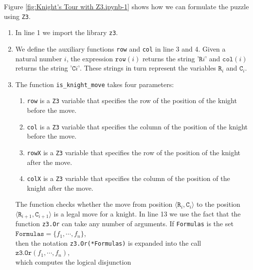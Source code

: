 Figure \ref{fig:Knight's Tour with Z3.ipynb-1} shows how we can formulate the puzzle using \texttt{Z3}.
\begin{enumerate}
\item In line 1 we import the library \texttt{z3}.
 
\item We define the auxiliary functions \texttt{row} and \texttt{col} in line 3 and 4.
      Given a natural number $i$, the expression $\mathtt{row}(i)$ returns the string $\texttt{'R}i\texttt{'}$
      and  $\mathtt{col}(i)$ returns the string  $\texttt{'C}i\texttt{'}$.  These strings in turn represent the
      variables $\mathtt{R}_i$ and $\mathtt{C}_i$.
\item The function \texttt{is\_knight\_move} takes four parameters:
      \begin{enumerate}
      \item \texttt{row} is a \texttt{Z3} variable that specifies the row of the position of the knight before
            the move. 
      \item \texttt{col} is a \texttt{Z3} variable that specifies the column of the position of the knight
            before the move. 
      \item \texttt{rowX} is a \texttt{Z3} variable that specifies the row of the position of the knight after
            the move. 
      \item \texttt{colX} is a \texttt{Z3} variable that specifies the column of the position of the knight
            after the move. 
      \end{enumerate}
      The function checks whether the move from position 
      $\langle \mathtt{R}_i, \mathtt{C}_i \rangle$ to the position $\langle \mathtt{R}_{i+1}, \mathtt{C}_{i+1} \rangle$
      is a legal move for a knight.  In line 13 we use the fact that the function \texttt{z3.Or}
      can take any number of arguments.  If \texttt{Formulas} is the set 
      \\[0.2cm]
      \hspace*{1.3cm}
      $\texttt{Formulas} = \{f_1, \cdots, f_n\}$,
      \\[0.2cm]
      then the notation \texttt{z3.Or(*Formulas)} is expanded into the call
      \\[0.2cm]
      \hspace*{1.3cm}
      $\texttt{z3.Or}(f_1, \cdots, f_n)$,
      \\[0.2cm]
      which computes the logical disjunction
      \\[0.2cm]
      \hspace*{1.3cm}

\end{enumerate}
